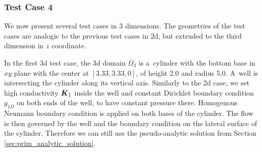 %
%

\subsubsection{Test Case 4}
We now present several test cases in 3 dimensions. The geometries of the test cases
are analogic to the previous test cases in 2d, but extruded to the third dimension in $z$ coordinate.

In the first 3d test case, the 3d domain $\Omega_3$ is a~cylinder with the bottom base in $xy$ plane
with the center at $[3.33,3.33,0]$, of height 2.0 and radius 5.0.
A~well is intersecting the cylinder along its vertical axis.
Similarly to the 2d case, we set high conductivity $\mathbf{\boldsymbol{K}}_1$ inside the well and constant Dirichlet boundary condition $g_{1D}$ on both ends of the well,
to have constant pressure there.
Homogenous Neumann boundary condition is applied on both bases of the cylinder. The flow is then governed 
by the well and the boundary condition on the lateral surface of the cylinder.
Therefore we can still use the pseudo-analytic solution from Section \ref{sec:prim_analytic_solution}.

